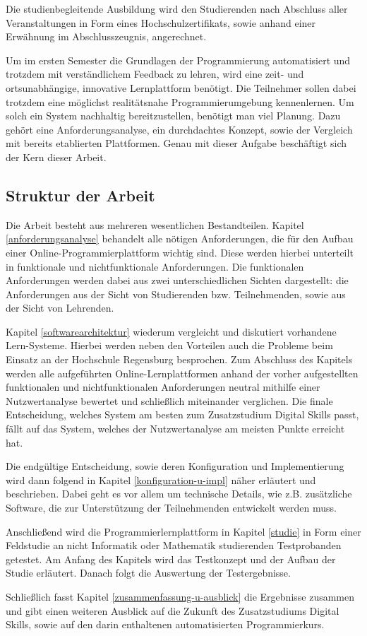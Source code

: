 \newpage

Die studienbegleitende Ausbildung wird den Studierenden nach Abschluss aller
Veranstaltungen in Form eines Hochschulzertifikats, sowie anhand einer Erwähnung
im Abschlusszeugnis, angerechnet.

Um im ersten Semester die Grundlagen der Programmierung automatisiert und
trotzdem mit verständlichem Feedback zu lehren, wird eine zeit- und
ortsunabhängige, innovative Lernplattform benötigt. Die Teilnehmer sollen dabei
trotzdem eine möglichst realitätsnahe Programmierumgebung kennenlernen. Um solch
ein System nachhaltig bereitzustellen, benötigt man viel Planung. Dazu gehört
eine Anforderungsanalyse, ein durchdachtes Konzept, sowie der Vergleich
mit bereits etablierten Plattformen. Genau mit dieser Aufgabe beschäftigt sich
der Kern dieser Arbeit.

\subsection{Struktur der Arbeit}\label{struktur-der-arbeit}
Die Arbeit besteht aus mehreren wesentlichen Bestandteilen. Kapitel
\ref{anforderungsanalyse} behandelt alle nötigen Anforderungen, die für den
Aufbau einer Online-Programmierplattform wichtig sind. Diese werden hierbei
unterteilt in funktionale und nichtfunktionale Anforderungen. Die funktionalen
Anforderungen werden dabei aus zwei unterschiedlichen Sichten dargestellt: die
Anforderungen aus der Sicht von Studierenden bzw. Teilnehmenden, sowie aus der
Sicht von Lehrenden.

Kapitel \ref{softwarearchitektur} wiederum vergleicht und diskutiert vorhandene
Lern-Systeme. Hierbei werden neben den Vorteilen auch die Probleme
beim Einsatz an der Hochschule Regensburg besprochen. Zum Abschluss des Kapitels
werden alle aufgeführten Online-Lernplattformen anhand der vorher aufgestellten
funktionalen und nichtfunktionalen Anforderungen neutral mithilfe einer
Nutzwertanalyse bewertet und schließlich miteinander verglichen. Die finale
Entscheidung, welches System am besten zum Zusatzstudium Digital Skills passt,
fällt auf das System, welches der Nutzwertanalyse am meisten Punkte erreicht
hat.

Die endgültige Entscheidung, sowie deren Konfiguration und Implementierung wird
dann folgend in Kapitel \ref{konfiguration-u-impl} näher erläutert und
beschrieben. Dabei geht es vor allem um technische Details, wie z.B. zusätzliche
Software, die zur Unterstützung der Teilnehmenden entwickelt werden muss.

Anschließend wird die Programmierlernplattform in Kapitel \ref{studie} in Form
einer Feldstudie an nicht Informatik oder Mathematik studierenden Testprobanden
getestet. Am Anfang des Kapitels wird das Testkonzept und der Aufbau der Studie
erläutert. Danach folgt die Auswertung der Testergebnisse.

Schließlich fasst Kapitel \ref{zusammenfassung-u-ausblick} die Ergebnisse
zusammen und gibt einen weiteren Ausblick auf die Zukunft des Zusatzstudiums
Digital Skills, sowie auf den darin enthaltenen automatisierten Programmierkurs.
